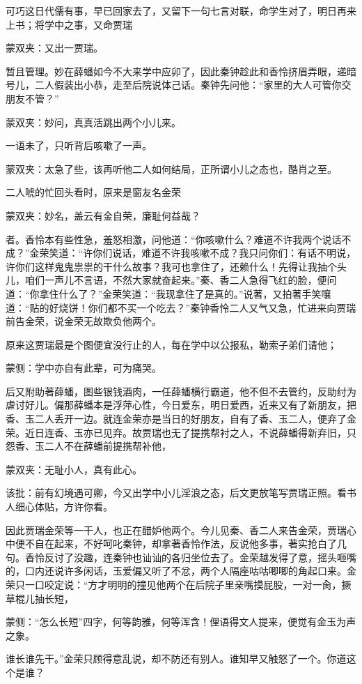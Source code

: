 \begin{parag}
    可巧这日代儒有事，早已回家去了，又留下一句七言对联，命学生对了，明日再来上书；将学中之事，又命贾瑞\begin{note}蒙双夹：又出一贾瑞。\end{note}暂且管理。妙在薛蟠如今不大来学中应卯了，因此秦钟趁此和香怜挤眉弄眼，递暗号儿，二人假装出小恭，走至后院说体己话。秦钟先问他：“家里的大人可管你交朋友不管？”\begin{note}蒙双夹：妙问，真真活跳出两个小儿来。\end{note}一语未了，只听背后咳嗽了一声。\begin{note}蒙双夹：太急了些，该再听他二人如何结局，正所谓小儿之态也，酷肖之至。\end{note}二人唬的忙回头看时，原来是窗友名金荣\begin{note}蒙双夹：妙名，盖云有金自荣，廉耻何益哉？\end{note}者。香怜本有些性急，羞怒相激，问他道：“你咳嗽什么？难道不许我两个说话不成？”金荣笑道：“许你们说话，难道不许我咳嗽不成？我只问你们：有话不明说，许你们这样鬼鬼祟祟的干什么故事？我可也拿住了，还赖什么！先得让我抽个头儿，咱们一声儿不言语，不然大家就奋起来。”秦、香二人急得飞红的脸，便问道：“你拿住什么了？”金荣笑道：“我现拿住了是真的。”说著，又拍著手笑嚷道：“贴的好烧饼！你们都不买一个吃去？”秦钟香怜二人又气又急，忙进来向贾瑞前告金荣，说金荣无故欺负他两个。
\end{parag}


\begin{parag}
    原来这贾瑞最是个图便宜没行止的人，每在学中以公报私，勒索子弟们请他；\begin{note}蒙侧：学中亦自有此辈，可为痛哭。\end{note}后又附助著薛蟠，图些银钱酒肉，一任薛蟠横行霸道，他不但不去管约，反助纣为虐讨好儿。偏那薛蟠本是浮萍心性，今日爱东，明日爱西，近来又有了新朋友，把香、玉二人丢开一边。就连金荣亦是当日的好朋友，自有了香、玉二人，便弃了金荣。近日连香、玉亦已见弃。故贾瑞也无了提携帮衬之人，不说薛蟠得新弃旧，只怨香、玉二人不在薛蟠前提携帮补他，\begin{note}蒙双夹：无耻小人，真有此心。\end{note}\begin{note}该批：前有幻境遇可卿，今又出学中小儿淫浪之态，后文更放笔写贾瑞正照。看书人细心体贴，方许你看。\end{note}因此贾瑞金荣等一干人，也正在醋妒他两个。今儿见秦、香二人来告金荣，贾瑞心中便不自在起来，不好呵叱秦钟，却拿著香怜作法，反说他多事，著实抢白了几句。香怜反讨了没趣，连秦钟也讪讪的各归坐位去了。金荣越发得了意，摇头咂嘴的，口内还说许多闲话，玉爱偏又听了不忿，两个人隔座咕咕唧唧的角起口来。金荣只一口咬定说：“方才明明的撞见他两个在后院子里亲嘴摸屁股，一对一肏，撅草棍儿抽长短，\begin{note}蒙侧：“怎么长短”四字，何等韵雅，何等浑含！俚语得文人提来，便觉有金玉为声之象。\end{note}谁长谁先干。”金荣只顾得意乱说，却不防还有别人。谁知早又触怒了一个。你道这个是谁？
\end{parag}



